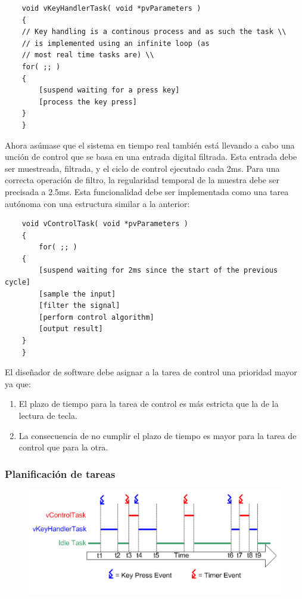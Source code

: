 \begin{verbatim}
    void vKeyHandlerTask( void *pvParameters )
    {
    // Key handling is a continous process and as such the task \\
    // is implemented using an infinite loop (as
    // most real time tasks are) \\
    for( ;; )
    {
        [suspend waiting for a press key]
        [process the key press]
    }
    }
\end{verbatim}

Ahora asúmase que el sistema en tiempo real también está llevando a cabo una unción de control que se basa en una entrada digital filtrada. Esta entrada debe ser muestreada, filtrada, y el ciclo de control ejecutado cada 2ms. Para una correcta operación de filtro, la regularidad temporal de la muestra debe ser precisada a 2.5ms. Esta funcionalidad debe ser implementada como una tarea autónoma con una estructura similar a la anterior: \\

\begin{verbatim}
    void vControlTask( void *pvParameters )
    {
        for( ;; )
    {
        [suspend waiting for 2ms since the start of the previous cycle]
        [sample the input]
        [filter the signal]
        [perform control algorithm]
        [output result]
    }
    }
\end{verbatim}

El diseñador de software debe asignar a la tarea de control una prioridad mayor ya que:

\begin{enumerate}
    \item El plazo de tiempo para la tarea de control es más estricta que la de la lectura de tecla.
    \item La consecuencia de no cumplir el plazo de tiempo es mayor para la tarea de control que para la otra.
\end{enumerate}

\subsubsection{Planificación de tareas}

\begin{figure}[H]
    \centering
    \includegraphics[scale=1]{RTOS/f3.PNG}
\end{figure}

